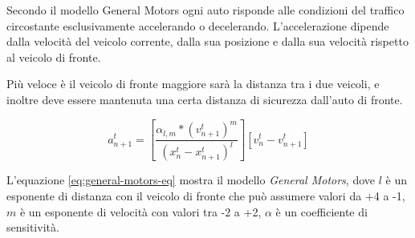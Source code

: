 Secondo il modello General Motors ogni auto risponde alle condizioni del traffico circostante esclusivamente accelerando o decelerando. 
L'accelerazione dipende dalla velocità del veicolo corrente, dalla sua posizione e dalla sua velocità rispetto al veicolo di fronte.

Più veloce è il veicolo di fronte maggiore sarà la distanza tra i due veicoli,
e inoltre deve essere mantenuta una certa distanza di sicurezza dall'auto di fronte.

\begin{equation}
  a_{n+1}^{t} = [ \frac{\alpha_{l, m} * (v_{n + 1}^{t})^{m} }{ (x_{n}^{t} - x_{n + 1}^{t})^{l}}][v_{n}^{t} - v_{n + 1}^{t}]
  \label{eq:general-motors-eq}
\end{equation}

L'equazione \ref{eq:general-motors-eq} mostra il modello \textit{General Motors},
dove $l$ è un esponente di distanza con il veicolo di fronte che può assumere valori da +4 a -1,
$m$ è un esponente di velocità con valori tra -2 a +2, $\alpha$ è un coefficiente di sensitività.

